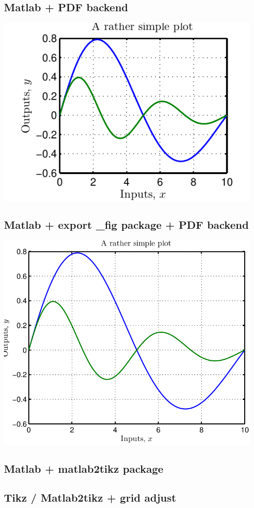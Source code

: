 \documentclass[10pt,a4paper,oneside,onecolumn]{article}
\begin{document}
\subsection{Matlab + PDF backend}
\begin{center}
\includegraphics{simple_plot/figure_matlab.pdf}
\end{center}

\subsection{Matlab + export \_fig package + PDF backend}
\begin{center}
\includegraphics{simple_plot/figure_matlab_export_fig.pdf}
\end{center}

\subsection{Matlab + matlab2tikz package}
\begin{center}

\end{center}

\newpage
\subsection{Tikz / Matlab2tikz + grid adjust}
\begin{center}

\\

\end{center}
\newpage
\end{document}
